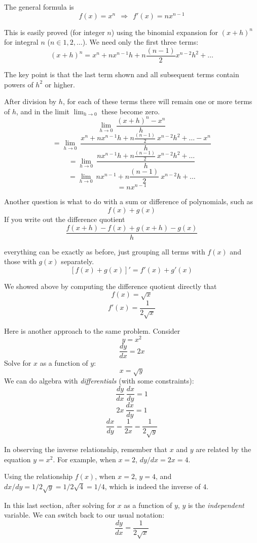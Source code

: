 \documentclass[11pt, oneside]{article}
\begin{document}
The general formula is
\[       f(x) = x^n \ \ \Rightarrow \ \  f'(x) = nx^{n-1} \]

This is easily proved (for integer $n$) using the binomial expansion for $(x + h)^n$ for integral $n$ ($n \in 1,2, \dots$).  We need only the first three terms:
\[         (x + h)^n = x^n + n x^{n-1} h + n\frac{(n-1)}{2}x^{n-2} h^2 + \dots  \]

The key point is that the last term shown and all subsequent terms contain powers of $h^2$ or higher.  

After division by $h$, for each of these terms there will remain one or more terms of $h$, and in the limit $\lim_{h \to 0}$ these become zero.
\[            \lim_{h \to 0} \ \frac{(x+h)^n - x^n}{h}  \]
\[            = \lim_{h \to 0} \ \frac{x^n + n x^{n-1} h + n\frac{(n-1)}{2} \ x^{n-2} h^2 + \dots - x^n}{h}  \]
\[            = \lim_{h \to 0} \ \frac{n x^{n-1} h + n\frac{(n-1)}{2}  \ x^{n-2} h^2 + \dots}{h}  \]
\[            = \lim_{h \to 0} \ n x^{n-1} + n\frac{(n-1)}{2}  \ x^{n-2} h + \dots  \]
\[            = n x^{n-1}  \]

Another question is what to do with a sum or difference of polynomials, such as 
\[            f(x) + g(x)    \]
If you write out the difference quotient
\[      \frac{ f(x+h) - f(x) + g(x+h) - g(x)}{h}  \]

everything can be exactly as before, just grouping all terms with $f(x)$ and those with $g(x)$ separately. 
\[      [f(x) + g(x)]' = f'(x) + g'(x)  \]

We showed above by computing the difference quotient directly that
\[      f(x) = \sqrt{x}  \] 
\[      f'(x) = \frac{1}{2\sqrt{x}}  \]

Here is another approach to the same problem.  Consider
\[      y = x^2  \]
\[      \frac{dy}{dx} = 2x  \]   
Solve for $x$ as a function of $y$:
\[      x = \sqrt{y}  \]
We can do algebra with \emph{differentials} (with some constraints):
\[      \frac{dy}{dx} \ \frac{dx}{dy} = 1  \]
\[      2 x \ \frac{dx}{dy} = 1  \]
\[      \frac{dx}{dy} = \frac{1}{2x} =\frac{1}{2 \sqrt{y}}  \]

In observing the inverse relationship, remember that $x$ and $y$ are related by the equation $y = x^2$.  For example, when $x=2$, $dy/dx = 2x = 4$.

Using the relationship $f(x)$, when $x=2$, $y=4$, and $dx/dy = 1/ 2 \sqrt{y} = 1/ 2 \sqrt{4} = 1/4$, which is indeed the inverse of $4$.

In this last section, after solving for $x$ as a function of $y$, $y$ is the \emph{independent} variable.  We can switch back to our usual notation:
\[      \frac{dy}{dx} =\frac{1}{2 \sqrt{x}}  \]
\end{document}
